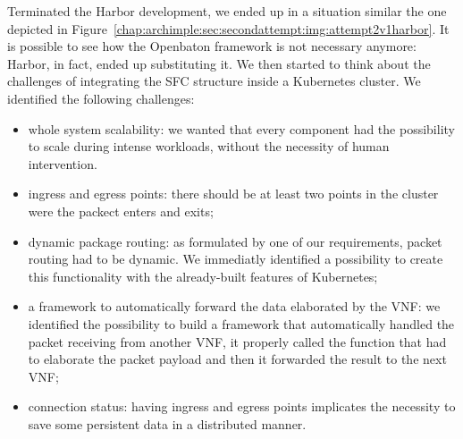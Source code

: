 Terminated the Harbor development, we ended up in a situation similar the one
depicted in Figure~\ref{chap:archimple:sec:secondattempt:img:attempt2v1harbor}.
It is possible to see how the Openbaton framework is not necessary anymore:
Harbor, in fact, ended up substituting it. We then started to think about the
challenges of integrating the SFC structure inside a Kubernetes cluster. We
identified the following challenges:
\begin{itemize}
\item whole system scalability: we wanted that every component had the
  possibility to scale during intense workloads, without the necessity of human
  intervention.
\item ingress and egress points: there should be at least two points in the
  cluster were the packect enters and exits;
\item dynamic package routing: as formulated by one of our requirements, packet
  routing had to be dynamic. We immediatly identified a possibility to create
  this functionality with the already-built features of Kubernetes;
\item a framework to automatically forward the data elaborated by the VNF: we
  identified the possibility to build a framework that automatically handled the
  packet receiving from another VNF, it properly called the function that had to
  elaborate the packet payload and then it forwarded the result to the next VNF;
\item connection status: having ingress and egress points implicates the
  necessity to save some persistent data in a distributed manner.
\end{itemize}


